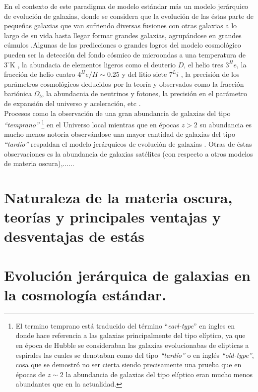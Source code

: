En el contexto de este paradigma de modelo estándar más un modelo jerárquico de evolución de galaxias, donde se considera que la evolución de las éstas parte de pequeñas galaxias que van sufriendo diversas fusiones con otras galaxias a lo largo de su vida hasta llegar formar grandes galaxias, agrupándose en grandes cúmulos \addcite .Algunas de las predicciones o grandes logros del modelo cosmológico pueden ser la detección del fondo cósmico de microondas a una temperatura de $3^\circ\mathrm{K}$ \addcite, la abundacia de elementos ligeros como el deuterio $D$, el helio tres $3^He$, la fracción de helio cuatro $4^He/H\sim 0.25$ y del litio siete $7^Li$ \addcite , la precisión de los parámetros cosmológicos deducidos por la teoría y observados como la fracción bariónica $\Omega_b$, la abundacnia de neutrinos y fotones, la precisión en el parámetro de expansión del universo y aceleración, etc \addcite.\\

Procesos como la observación de una gran abundancia de galaxias del tipo \textit{``temprano''} \footnote{El termino temprano está traducido del término ``\textit{earl-type}'' en ingles en donde hace referencia a las galaxias principalmente del tipo elíptico, ya que en época de Hubble se consideraban las galaxias evolucionabas de elipticas a espirales las cuales se denotaban como del tipo \textit{``tardío''} o en inglés \textit{``old-type''}, cosa que se demostró no ser cierta siendo precisamente una prueba que en épocas de $z\sim 2$ la abundancia de galaxias del tipo elíptico eran mucho menos abundantes que en la actualidad.} en el Universo local mientras que en épocas $z >2$ su abundancia es mucho menos notoria observándose una mayor cantidad de galaxias del tipo \textit{``tardío''} \addcite respaldan el modelo jerárquicos de evolución de galaxias \addcite. Otras de éstas observaciones es la abundancia de galaxias satélites (con respecto a otros modelos de materia oscura),......



\section{Naturaleza de la materia oscura, teorías y principales ventajas y desventajas de estás}

\section{Evolución jerárquica de galaxias en la cosmología estándar.}

